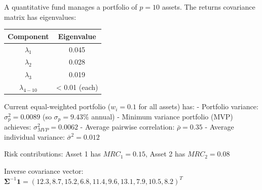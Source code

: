 \documentclass[12pt]{article}
\begin{document}
A quantitative fund manages a portfolio of $p=10$ assets. The returns covariance matrix has eigenvalues:

\begin{center}
\begin{tabular}{cc}
\toprule
Component & Eigenvalue \\
\midrule
$\lambda_1$ & 0.045 \\
$\lambda_2$ & 0.028 \\
$\lambda_3$ & 0.019 \\
$\lambda_{4-10}$ & < 0.01 (each) \\
\bottomrule
\end{tabular}
\end{center}

Current equal-weighted portfolio ($w_i = 0.1$ for all assets) has:
- Portfolio variance: $\sigma_p^2 = 0.0089$ (so $\sigma_p = 9.43\%$ annual)
- Minimum variance portfolio (MVP) achieves: $\sigma_{MVP}^2 = 0.0062$
- Average pairwise correlation: $\bar{\rho} = 0.35$
- Average individual variance: $\bar{\sigma}^2 = 0.012$

Risk contributions: Asset 1 has $MRC_1 = 0.15$, Asset 2 has $MRC_2 = 0.08$

Inverse covariance vector: $\boldsymbol{\Sigma}^{-1}\mathbf{1} = (12.3, 8.7, 15.2, 6.8, 11.4, 9.6, 13.1, 7.9, 10.5, 8.2)^T$
\end{document}

